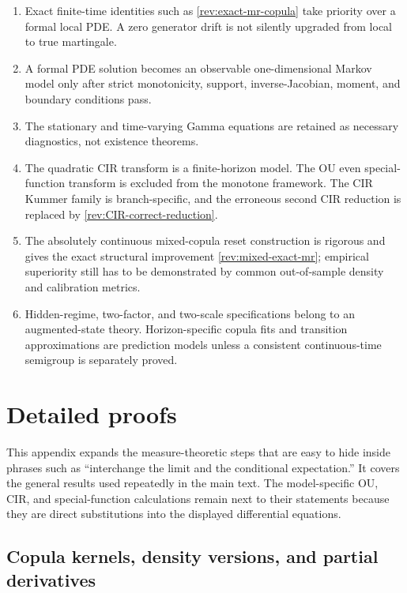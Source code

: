 \documentclass[11pt]{article}
\theoremstyle{remark}
\begin{document}
\begin{enumerate}[label=(\roman*)]
\item Exact finite-time identities such as \eqref{rev:exact-mr-copula} take
priority over a formal local PDE.  A zero generator drift is not silently
upgraded from local to true martingale.
\item A formal PDE solution becomes an observable one-dimensional Markov model
only after strict monotonicity, support, inverse-Jacobian, moment, and boundary
conditions pass.
\item The stationary and time-varying Gamma equations are retained as necessary
diagnostics, not existence theorems.
\item The quadratic CIR transform is a finite-horizon model.  The OU even
special-function transform is excluded from the monotone framework.  The CIR
Kummer family is branch-specific, and the erroneous second CIR reduction is
replaced by \eqref{rev:CIR-correct-reduction}.
\item The absolutely continuous mixed-copula reset construction is rigorous and gives the exact
structural improvement \eqref{rev:mixed-exact-mr}; empirical superiority still
has to be demonstrated by common out-of-sample density and calibration metrics.
\item Hidden-regime, two-factor, and two-scale specifications belong to an
augmented-state theory.  Horizon-specific copula fits and transition
approximations are prediction models unless a consistent continuous-time
semigroup is separately proved.
\end{enumerate}

\clearpage
\appendix
\section{Detailed proofs}
\label{rev:sec-detailed-proofs}

This appendix expands the measure-theoretic steps that are easy to hide inside
phrases such as ``interchange the limit and the conditional expectation.''
It covers the general results used repeatedly in the main text.  The
model-specific OU, CIR, and special-function calculations remain next to their
statements because they are direct substitutions into the displayed
differential equations.

\subsection{Copula kernels, density versions, and partial derivatives}
\label{rev:app-copula-kernel-proof}
\end{document}
